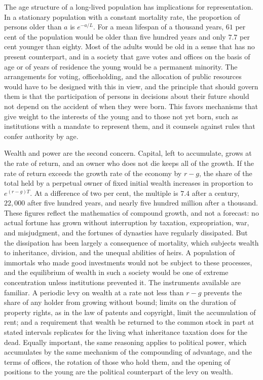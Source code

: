 The age structure of a long-lived population has implications for representation. In a stationary population with a constant mortality rate, the proportion of persons older than $a$ is $e^{-a/L}$. For a mean lifespan of a thousand years, $61$ per cent of the population would be older than five hundred years and only $7.7$ per cent younger than eighty. Most of the adults would be old in a sense that has no present counterpart, and in a society that gave votes and offices on the basis of age or of years of residence the young would be a permanent minority. The arrangements for voting, officeholding, and the allocation of public resources would have to be designed with this in view, and the principle that should govern them is that the participation of persons in decisions about their future should not depend on the accident of when they were born. This favors mechanisms that give weight to the interests of the young and to those not yet born, such as institutions with a mandate to represent them, and it counsels against rules that confer authority by age.

Wealth and power are the second concern. Capital, left to accumulate, grows at the rate of return, and an owner who does not die keeps all of the growth. If the rate of return exceeds the growth rate of the economy by $r-g$, the share of the total held by a perpetual owner of fixed initial wealth increases in proportion to $e^{(r-g)T}$. At a difference of two per cent, the multiple is $7.4$ after a century, $22{,}000$ after five hundred years, and nearly five hundred million after a thousand. These figures reflect the mathematics of compound growth, and not a forecast: no actual fortune has grown without interruption by taxation, expropriation, war, and misjudgment, and the fortunes of dynasties have regularly dissipated. But the dissipation has been largely a consequence of mortality, which subjects wealth to inheritance, division, and the unequal abilities of heirs. A population of immortals who made good investments would not be subject to these processes, and the equilibrium of wealth in such a society would be one of extreme concentration unless institutions prevented it. The instruments available are familiar. A periodic levy on wealth at a rate not less than $r-g$ prevents the share of any holder from growing without bound; limits on the duration of property rights, as in the law of patents and copyright, limit the accumulation of rent; and a requirement that wealth be returned to the common stock in part at stated intervals replicates for the living what inheritance taxation does for the dead. Equally important, the same reasoning applies to political power, which accumulates by the same mechanism of the compounding of advantage, and the terms of offices, the rotation of those who hold them, and the opening of positions to the young are the political counterpart of the levy on wealth.

